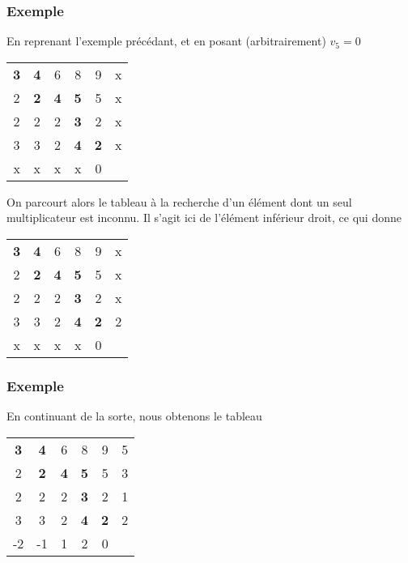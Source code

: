 \documentclass[usepdftitle=false, aspectratio=169]{beamer}
\begin{document}
\begin{frame}
\frametitle{Exemple}

En reprenant l'exemple précédant, et en posant (arbitrairement) $v_5 = 0$
\begin{center}
	\begin{tabular}{ccccc|c}
		{\bf 3} & {\bf 4} & 6 & 8 & 9 & x \\
		2 & {\bf 2} & {\bf 4} & {\bf 5} & 5 & x \\
		2 & 2 & 2 & {\bf 3} & 2 & x \\
		3 & 3 & 2 & {\bf 4} & {\bf 2} & x \\
		\hline
		x & x & x & x & 0 & 
	\end{tabular}
\end{center}
On parcourt alors le tableau à la recherche d'un élément dont un seul multiplicateur est inconnu. Il s'agit ici de l'élément inférieur droit, ce qui donne
\begin{center}
	\begin{tabular}{ccccc|c}
		{\bf 3} & {\bf 4} & 6 & 8 & 9 & x \\
		2 & {\bf 2} & {\bf 4} & {\bf 5} & 5 & x \\
		2 & 2 & 2 & {\bf 3} & 2 & x \\
		3 & 3 & 2 & {\bf 4} & {\bf 2} & 2 \\
		\hline
		x & x & x & x & 0 & 
	\end{tabular}
\end{center}

\end{frame}

\begin{frame}
\frametitle{Exemple}

En continuant de la sorte, nous obtenons le tableau
\begin{center}
\begin{tabular}{ccccc|c}
{\bf 3} & {\bf 4} & 6 & 8 & 9 & 5 \\
2 & {\bf 2} & {\bf 4} & {\bf 5} & 5 & 3 \\
2 & 2 & 2 & {\bf 3} & 2 & 1 \\
3 & 3 & 2 & {\bf 4} & {\bf 2} & 2 \\
\hline
-2 & -1 & 1 & 2 & 0 & 
\end{tabular}
\end{center}


\end{frame}
\end{document}
